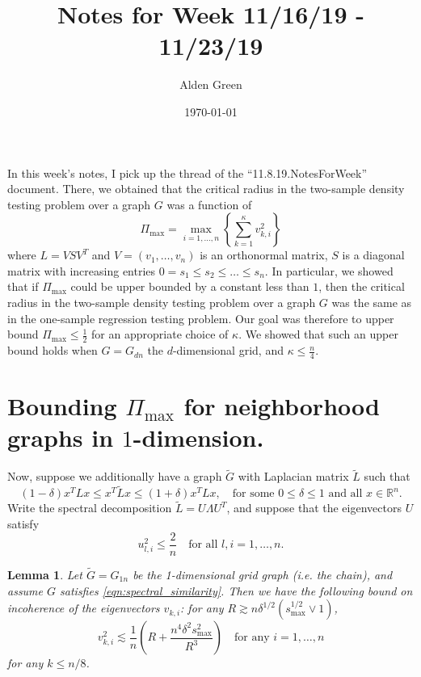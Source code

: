 \documentclass{article}
\newcommand{\Reals}{\mathbb{R}}
\newcommand{\set}[1]{\left\{#1\right\}}
\newcommand{\1}{\mathbf{1}}
\theoremstyle{alden}
\theoremstyle{aldenthm}
\newtheorem{lemma}{Lemma}
\theoremstyle{definition}
\theoremstyle{remark}
\begin{document}
\title{Notes for Week 11/16/19 - 11/23/19}
\author{Alden Green}
\date{\today}
\maketitle

In this week's notes, I pick up the thread of the ``11.8.19.NotesForWeek'' document. There, we obtained that the critical radius in the two-sample density testing problem over a graph $G$ was a function of
\begin{equation*}
\Pi_{\max} = \max_{i = 1,\ldots,n} \set{\sum_{k = 1}^{\kappa} v_{k,i}^2}
\end{equation*}
where $L = V S V^T$ and $V = (v_1,\ldots,v_n)$ is an orthonormal matrix, $S$ is a diagonal matrix with increasing entries $0 = s_1 \leq s_2 \leq \ldots \leq s_n$. In particular, we showed that if $\Pi_{\max}$ could be upper bounded by a constant less than $1$, then the critical radius in the two-sample density testing problem over a graph $G$ was the same as in the one-sample regression testing problem. Our goal was therefore to upper bound $\Pi_{\max} \leq \frac{1}{2}$ for an appropriate choice of $\kappa$. We showed that such an upper bound holds when $G = G_{dn}$ the $d$-dimensional grid, and $\kappa \leq \frac{n}{4}$. 

\section{Bounding $\Pi_{\max}$ for neighborhood graphs in $1$-dimension.}
Now, suppose we additionally have a graph $\widetilde{G}$ with Laplacian matrix $\widetilde{L}$ such that
\begin{equation}
\label{eqn:spectral_similarity}
(1 - \delta) x^T L x \leq x^T \widetilde{L} x \leq (1 + \delta) x^T L x, \quad \textrm{for some $0 \leq \delta \leq 1$ and all $x \in \Reals^n$.}
\end{equation}
Write the spectral decomposition $\widetilde{L} = U \Lambda U^T$, and suppose that the eigenvectors $U$ satisfy
\begin{equation}
\label{eqn:incoherence_tilde}
u_{l,i}^2 \leq \frac{2}{n} \quad \textrm{for all $l,i = 1,\ldots,n$.}
\end{equation}

\begin{lemma}
	\label{lem:incoherence}
	Let $\widetilde{G} = G_{1n}$ be the 1-dimensional grid graph (i.e. the chain), and assume $G$ satisfies \eqref{eqn:spectral_similarity}. Then we have the following bound on incoherence of the eigenvectors $v_{k,i}$: for any $R \gtrsim n \delta^{1/2} (s_{\max}^{1/2} \vee 1)$,
	\begin{equation*}
	v_{k,i}^2 \lesssim \frac{1}{n}\left(R + \frac{n^4 \delta^2 s_{\max}^2}{R^3}\right) \quad \textrm{for any $i = 1,\ldots,n$}
	\end{equation*} 
	for any $k \leq n/8$.
\end{lemma}
\end{document}
